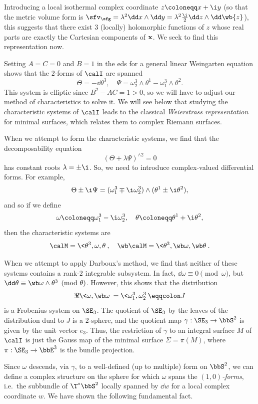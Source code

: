 Introducing a local isothermal complex coordinate $z\coloneqq x+\i y$ (so that the metric volume form is $\sfv_\sfg=\lambda^2\dd x\wedge\dd y=\lambda^2\frac{\i}{2}\dd z\wedge\dd\wb{z}$), this suggests that there exist $3$ (locally) holomorphic functions of $z$ whose real parts are exactly the Cartesian components of $\bf{x}$. We seek to find this representation now.

Setting $A=C=0$ and $B=1$ in the \gls{eds} for a general linear Weingarten equation shows that the $2$-forms of $\calI$ are spanned 
\[\Theta=-\dd\theta^3,\quad \Psi=\omega^3_2\wedge\theta^1-\omega^3_1\wedge\theta^2.\]
This system is elliptic since $B^2-AC=1>0$, so we will have to adjust our method of characteristics to solve it. We will see below that studying the characteristic systems of $\calI$ leads to the classical \emph{Weierstrass representation} for minimal surfaces, which relates them to complex Riemann surfaces.

When we attempt to form the characteristic systems, we find that the decomposability equation 
\[(\Theta+\lambda\Psi)^{\wedge 2}=0\]
has constant roots $\lambda=\pm\i$. So, we need to introduce complex-valued differential forms. For example,
\[\Theta\pm \i \Psi=(\omega^3_1\mp \i \omega^3_2)\wedge(\theta^1\pm\i \theta^2),\]
and so if we define 
\[\omega\coloneqq \omega^3_1-\i \omega^3_2,\quad \theta\coloneqq \theta^1+\i \theta^2,\]
then the characteristic systems are 
\[\calM=\<\theta^3,\omega,\theta\>,\quad \wb\calM=\<\theta^3,\wb\omega,\wb\theta\>.\]

When we attempt to apply Darboux's method, we find that neither of these systems contains a rank-$2$ integrable subsystem. In fact, $\dd\omega\equiv 0\pmod{\omega}$, but $\dd\theta\equiv \wb\omega\wedge\theta^3\pmod{\theta}$. However, this shows that the distribution
\[\Re\<\omega,\wb\omega\>=\<\omega^3_1,\omega^3_2\>\eqqcolon J\]
is a Frobenius system on $\SE_3$. The quotient of $\SE_3$ by the leaves of the distribution dual to $J$ is a $2$-sphere, and the quotient map $\gamma:\SE_3\to \bbS^2$ is given by the unit vector $e_3$. Thus, the restriction of $\gamma$ to an integral surface $M$ of $\calI$ is just the Gauss map of the minimal surface $\Sigma=\pi(M)$, where $\pi:\SE_3\to \bbE^3$ is the bundle projection.

Since $\omega$ descends, via $\gamma$, to a well-defined (up to multiple) form on $\bbS^2$, we can define a complex structure on the sphere for which $\omega$ spans the \emph{$(1,0)$-forms}, i.e.\ the subbundle of $\T^\ast \bbS^2$ locally spanned by $\dd w$ for a local complex coordinate $w$. We have shown the following fundamental fact.


